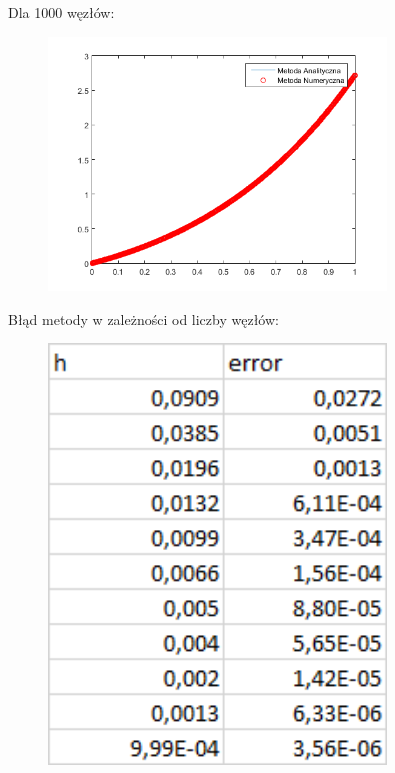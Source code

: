 \begin{samepage}
	Dla 1000 węzłów:
	
	\FloatBarrier
	\begin{figure}[!ht]
		\begin{center}
			\includegraphics[width=0.8\textwidth]{Lab4/charts/zad4/c/1000.png}
		\end{center}
	\end{figure}
	\FloatBarrier
\end{samepage}

\newpage

Błąd metody w zależności od liczby węzłów:

\begin{samepage}
	\FloatBarrier
	\begin{figure}[!ht]
		\begin{center}
			\includegraphics[width=0.8\textwidth]{Lab4/charts/zad4/c/error_dane.png}
		\end{center}
	\end{figure}
	\FloatBarrier
\end{samepage}

